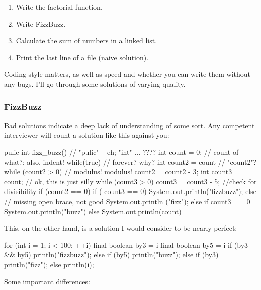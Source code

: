 \documentclass{article}
\begin{document}
\begin{enumerate}
\item{Write the factorial function.}
\item{Write FizzBuzz.}
\item{Calculate the sum of numbers in a linked list.}
\item{Print the last line of a file (naive solution).}
\end{enumerate}

    Coding style matters, as well as speed and whether you can write them
    without any bugs. I'll go through some solutions of varying quality.

\subsubsection{FizzBuzz}
      Bad solutions indicate a deep lack of understanding of some sort. Any
      competent interviewer will count a solution like this against you:

\begin{javacode}
pulic int fizz_buzz() {         // "pulic" -- eh; "int" ... ????
int count = 0;                  // count of what?; also, indent!
while(true) {                   // forever? why?
int count2 = count              // "count2"?
while (count2 > 0) {            // modulus! modulus!
count2 = count2 - 3;
}
int count3 = count;             // ok, this is just silly
while (count3 > 0) {
count3 = count3 - 5;
}
//check for divisibility
if (count2 == 0){
if ( count3 == 0) {
System.out.println("fizzbuzz");
}
else                            // missing open brace, not good
System.out.println ("fizz");
}
else
if count3 == 0 {
System.out.println("buzz")
}
else {
System.out.println(count)
}
}
} \end{javacode}

      This, on the other hand, is a solution I would consider to be nearly
      perfect:

\begin{javacode}
for (int i = 1; i < 100; ++i) {
  final boolean by3 = i %
  final boolean by5 = i %
  if (by3 && by5)
    println("fizzbuzz");
  else if (by5)
    println("buzz");
  else if (by3)
    println("fizz");
  else
    println(i);
} \end{javacode}

      Some important differences:
\end{document}
